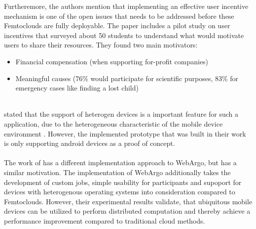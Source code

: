 Furtheremore, the authors mention that implementing an effective user incentive mechanism is one of the open issues that needs to be addressed before these Femtoclouds are fully deployable. The paper includes a pilot study on user incentives that surveyed about 50 students to understand what would motivate users to share their resources. They found two main motivators:
\begin{itemize}
  \item Financial compensation (when supporting for-profit companies)
  \item Meaningful causes (76\% would participate for scientific purposes, 83\% for emergency cases like finding a lost child)
\end{itemize}
~\\
\citeauthor{relatedwork:mobilecloud} stated that the support of heterogen devices is a important feature for such a application, due to the heterogeneous characteristic of the mobile device environment \cite{relatedwork:mobilecloud}. However, the implemented prototype that was built in their work is only supporting android devices as a proof of concept.
\\~\\
The work of \citeauthor{relatedwork:mobilecloud} has a different implementation approach to WebArgo, but has a similar motivation. The implementation of WebArgo additionally takes the development of custom jobs, simple usability for participants and supoport for devices with heterogenous operating systems into consideration compared to Femtoclouds. However, their experimental results validate, that ubiquitous mobile devices can be utilized to perform distributed computation and thereby achieve a performance improvement compared to traditional cloud methods.